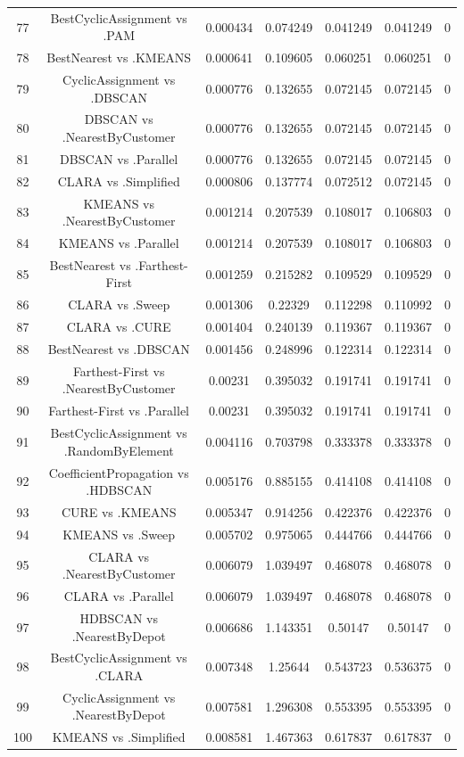 \documentclass[a4paper,10pt]{article}
\begin{document}
\begin{landscape}
\begin{table}[!htp]
\begin{tabular}{ccccccc}
77&BestCyclicAssignment vs .PAM&0.000434&0.074249&0.041249&0.041249&0\\
78&BestNearest vs .KMEANS&0.000641&0.109605&0.060251&0.060251&0\\
79&CyclicAssignment vs .DBSCAN&0.000776&0.132655&0.072145&0.072145&0\\
80&DBSCAN vs .NearestByCustomer&0.000776&0.132655&0.072145&0.072145&0\\
81&DBSCAN vs .Parallel&0.000776&0.132655&0.072145&0.072145&0\\
82&CLARA vs .Simplified&0.000806&0.137774&0.072512&0.072145&0\\
83&KMEANS vs .NearestByCustomer&0.001214&0.207539&0.108017&0.106803&0\\
84&KMEANS vs .Parallel&0.001214&0.207539&0.108017&0.106803&0\\
85&BestNearest vs .Farthest-First&0.001259&0.215282&0.109529&0.109529&0\\
86&CLARA vs .Sweep&0.001306&0.22329&0.112298&0.110992&0\\
87&CLARA vs .CURE&0.001404&0.240139&0.119367&0.119367&0\\
88&BestNearest vs .DBSCAN&0.001456&0.248996&0.122314&0.122314&0\\
89&Farthest-First vs .NearestByCustomer&0.00231&0.395032&0.191741&0.191741&0\\
90&Farthest-First vs .Parallel&0.00231&0.395032&0.191741&0.191741&0\\
91&BestCyclicAssignment vs .RandomByElement&0.004116&0.703798&0.333378&0.333378&0\\
92&CoefficientPropagation vs .HDBSCAN&0.005176&0.885155&0.414108&0.414108&0\\
93&CURE vs .KMEANS&0.005347&0.914256&0.422376&0.422376&0\\
94&KMEANS vs .Sweep&0.005702&0.975065&0.444766&0.444766&0\\
95&CLARA vs .NearestByCustomer&0.006079&1.039497&0.468078&0.468078&0\\
96&CLARA vs .Parallel&0.006079&1.039497&0.468078&0.468078&0\\
97&HDBSCAN vs .NearestByDepot&0.006686&1.143351&0.50147&0.50147&0\\
98&BestCyclicAssignment vs .CLARA&0.007348&1.25644&0.543723&0.536375&0\\
99&CyclicAssignment vs .NearestByDepot&0.007581&1.296308&0.553395&0.553395&0\\
100&KMEANS vs .Simplified&0.008581&1.467363&0.617837&0.617837&0\\

\end{tabular}
\end{table}
\end{landscape}
\end{document}
